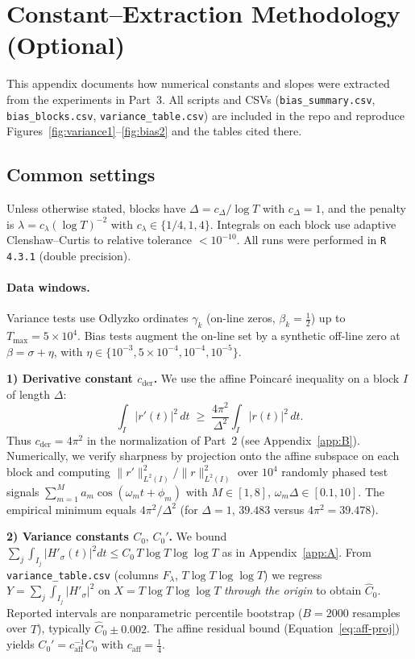 \section{Constant–Extraction Methodology (Optional)}
\label{app:C}

This appendix documents how numerical constants and slopes were extracted from the
experiments in Part~3.  All scripts and CSVs (\texttt{bias\_summary.csv},
\texttt{bias\_blocks.csv}, \texttt{variance\_table.csv}) are included in the repo and
reproduce Figures~\ref{fig:variance1}--\ref{fig:bias2} and the tables cited there.

\subsection*{Common settings}
Unless otherwise stated, blocks have
$\Delta=c_\Delta/\log T$ with $c_\Delta=1$,
and the penalty is $\lambda=c_\lambda(\log T)^{-2}$ with $c_\lambda\in\{1/4,1,4\}$.
Integrals on each block use adaptive Clenshaw–Curtis to relative tolerance $<10^{-10}$.
All runs were performed in \texttt{R 4.3.1} (double precision).

\paragraph{Data windows.}
Variance tests use Odlyzko ordinates $\gamma_k$ (on-line zeros, $\beta_k=\tfrac12$)
up to $T_{\max}=5\times10^4$.  Bias tests augment the on-line set by a synthetic
off-line zero at $\beta=\sigma+\eta$, with $\eta\in\{10^{-3},5\!\times\!10^{-4},10^{-4},10^{-5}\}$.

\medskip
\noindent\textbf{1) Derivative constant $c_{\mathrm{der}}$.}
We use the affine Poincaré inequality on a block $I$ of length $\Delta$:
\[
\int_I |r'(t)|^2\,dt \;\ge\; \frac{4\pi^2}{\Delta^2}\int_I |r(t)|^2\,dt.
\]
Thus $c_{\mathrm{der}}=4\pi^2$ in the normalization of Part~2
(see Appendix~\ref{app:B}).  Numerically, we verify sharpness by
projection onto the affine subspace on each block and computing
$\|r'\|_{L^2(I)}^2 / \|r\|_{L^2(I)}^2$ over $10^4$ randomly phased test
signals $\sum_{m=1}^M a_m\cos(\omega_m t+\phi_m)$ with $M\in[1,8]$,
$\omega_m\Delta\in[0.1,10]$.  The empirical minimum equals
$4\pi^2/\Delta^2$ (for $\Delta=1$, $39.483$ versus $4\pi^2=39.478$).

\medskip
\noindent\textbf{2) Variance constants $C_0,\,C_0'$.}
We bound
\(
\sum_j \int_{I_j} |H'_\sigma(t)|^2 dt
\le C_0\, T\log T\log\log T
\)
as in Appendix~\ref{app:A}.  From \texttt{variance\_table.csv}
(columns $F_\lambda$, $T\log T\log\log T$) we regress
$Y= \sum_j \int_{I_j} |H'_\sigma|^2$ on
$X=T\log T\log\log T$ \emph{through the origin} to obtain
$\widehat{C}_0$.  Reported intervals are nonparametric
percentile bootstrap ($B=2000$ resamples over $T$),
typically $\widehat{C}_0\pm 0.002$.  The affine residual bound
(Equation~\eqref{eq:aff-proj}) yields $C_0'=c_{\mathrm{aff}}^{-1}C_0$
with $c_{\mathrm{aff}}=\tfrac14$.

